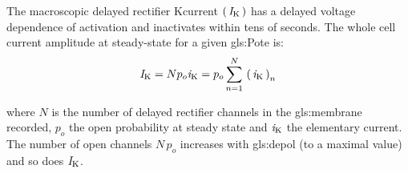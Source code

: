 \documentclass[class={myRUCProject}, crop=false]{standalone}
\begin{document}

The macroscopic delayed rectifier \gls{K}current \(\left(\,\mathit{I}_\mathrm{K}\,\right)\) has a delayed voltage dependence of activation and inactivates within tens of seconds. 
The whole cell current amplitude at steady-state for a given \gls{gls:Pote} is:
\begin{equation}\label{eq:ksum}
    \mathit{I}_\mathrm{K} = N p_o \mathit{i}_\mathrm{K} = p_o \sum^N_{n=1} \, \left(\,\mathit{i}_\mathrm{K}\,\right)_n 
\end{equation}

where \(N\) is the number of delayed rectifier channels in the \gls{gls:membrane} recorded, \(p_o\) the open probability at steady state and \(\mathit{i}_\mathrm{K}\) the elementary current. The number of open channels \(N\,p_o\) increases with \gls{gls:depol} (to a maximal value) and so does \(\mathit{I}_\mathrm{K}\). 
\end{document}
